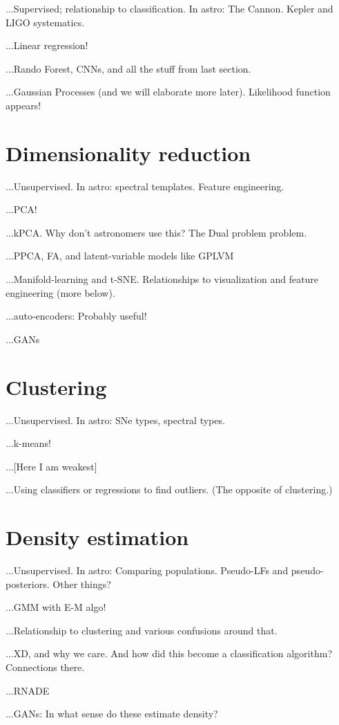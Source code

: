 \documentclass[12pt, letterpaper]{article}
\begin{document}
...Supervised; relationship to classification. In astro: The Cannon. Kepler and LIGO systematics.

...Linear regression!

...Rando Forest, CNNs, and all the stuff from last section.

...Gaussian Processes (and we will elaborate more later). Likelihood function appears!

\section{Dimensionality reduction}

...Unsupervised. In astro: spectral templates. Feature engineering.

...PCA!

...kPCA. Why don't astronomers use this? The Dual problem problem.

...PPCA, FA, and latent-variable models like GPLVM

...Manifold-learning and t-SNE. Relationships to visualization and feature engineering (more below).

...auto-encoders: Probably useful!

...GANs

\section{Clustering}

...Unsupervised. In astro: SNe types, spectral types.

...k-means!

...[Here I am weakest]

...Using classifiers or regressions to find outliers. (The opposite of clustering.)

\section{Density estimation}

...Unsupervised. In astro: Comparing populations. Pseudo-LFs and pseudo-posteriors. Other things?

...GMM with E-M algo!

...Relationship to clustering and various confusions around that.

...XD, and why we care. And how did this become a classification algorithm? Connections there.

...RNADE

...GANs: In what sense do these estimate density?
\end{document}
